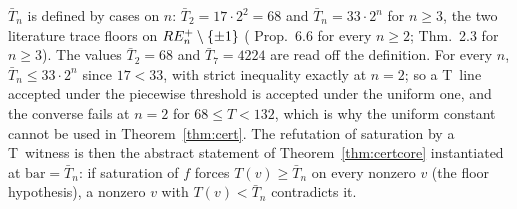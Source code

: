 $\bar T_n$ is defined by cases on $n$: $\bar T_2=17\cdot2^2=68$ and $\bar T_n=33\cdot2^n$ for $n\ge3$, the two literature trace floors on $RE^{+}_n\setminus\{\pm1\}$ (\cite{MO3} Prop.~6.6 for every $n\ge2$; \cite{KY} Thm.~2.3 for $n\ge3$). The values $\bar T_2=68$ and $\bar T_7=4224$ are read off the definition. For every $n$, $\bar T_n\le33\cdot2^n$ since $17<33$, with strict inequality exactly at $n=2$; so a T~line accepted under the piecewise threshold is accepted under the uniform one, and the converse fails at $n=2$ for $68\le T<132$, which is why the uniform constant cannot be used in Theorem~\ref{thm:cert}. The refutation of saturation by a T~witness is then the abstract statement of Theorem~\ref{thm:certcore} instantiated at $\mathrm{bar}=\bar T_n$: if saturation of $f$ forces $T(v)\ge\bar T_n$ on every nonzero $v$ (the floor hypothesis), a nonzero $v$ with $T(v)<\bar T_n$ contradicts it.
